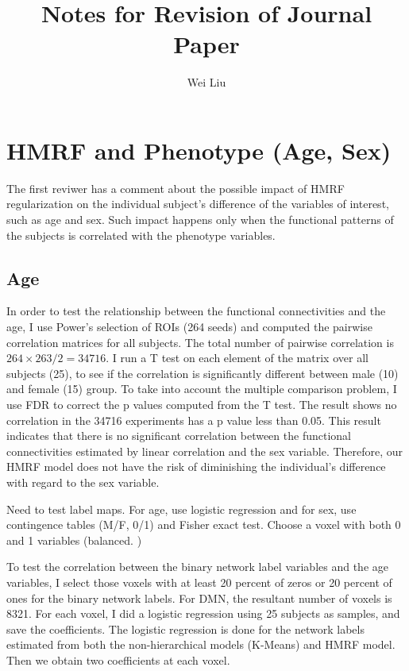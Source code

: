 \documentclass[12pt]{article}
\begin{document}
\title{Notes for Revision of Journal Paper}
\author{Wei Liu}
\maketitle

\section{HMRF and Phenotype (Age, Sex)}
The first reviwer has a comment about the possible impact of HMRF regularization
on the individual subject's difference of the variables of interest, such as age
and sex. Such impact happens only when the functional patterns of the subjects
is correlated with the phenotype variables. 

\subsection{Age}
In order to test the relationship between the functional connectivities and the
age, I use Power's selection of ROIs (264 seeds) and computed the pairwise
correlation matrices for all subjects. The total number of pairwise correlation
is $264 \times 263 / 2 = 34716$. I run a T test on each element of the matrix over
all subjects (25), to see if the correlation is significantly different between
male (10) and female (15) group. To take into account the multiple comparison
problem, I use FDR to correct the p values computed from the T test. The result
shows no correlation in the 34716 experiments has a p value less than 0.05. This
result indicates that there is no significant correlation between the functional
connectivities estimated by linear correlation and the sex variable. Therefore,
our HMRF model does not have the risk of diminishing the individual's difference
with regard to the sex variable.

Need to test label maps. For age, use logistic regression and for sex, use
contingence tables (M/F, 0/1) and Fisher exact test. Choose a voxel with both 0
and 1 variables (balanced. )

To test the correlation between the binary network label variables and the
\textsf{age} variables, I select those voxels with at least 20 percent of zeros
or 20 percent of ones for the binary network labels. For DMN, the resultant
number of voxels is 8321. For each voxel, I did a logistic regression using 25
subjects as samples, and save the coefficients. The logistic regression is done
for the network labels estimated from both the non-hierarchical models (K-Means)
and HMRF model. Then we obtain two coefficients at each voxel. 
\end{document}
